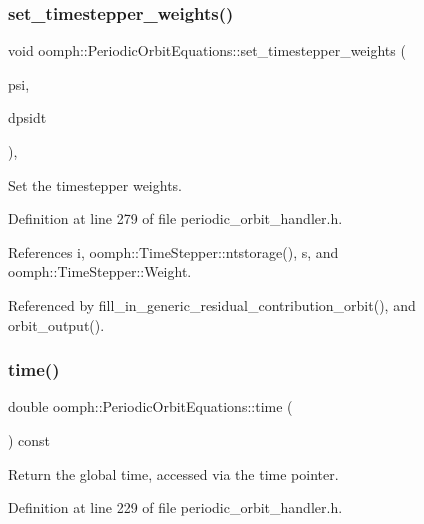 \subsubsection{\texorpdfstring{set\+\_\+timestepper\+\_\+weights()}{set\_timestepper\_weights()}}
{\footnotesize\ttfamily void oomph\+::\+Periodic\+Orbit\+Equations\+::set\+\_\+timestepper\+\_\+weights (\begin{DoxyParamCaption}\item[{const \hyperlink{classoomph_1_1Shape}{Shape} \&}]{psi,  }\item[{const \hyperlink{classoomph_1_1DShape}{D\+Shape} \&}]{dpsidt }\end{DoxyParamCaption})\hspace{0.3cm}{\ttfamily [inline]}, {\ttfamily [protected]}}



Set the timestepper weights. 



Definition at line 279 of file periodic\+\_\+orbit\+\_\+handler.\+h.



References i, oomph\+::\+Time\+Stepper\+::ntstorage(), s, and oomph\+::\+Time\+Stepper\+::\+Weight.



Referenced by fill\+\_\+in\+\_\+generic\+\_\+residual\+\_\+contribution\+\_\+orbit(), and orbit\+\_\+output().

\mbox{\label{classoomph_1_1PeriodicOrbitEquations_a75baee083d554768bd75135196ab26c5}} 
\subsubsection{\texorpdfstring{time()}{time()}}
{\footnotesize\ttfamily double oomph\+::\+Periodic\+Orbit\+Equations\+::time (\begin{DoxyParamCaption}{ }\end{DoxyParamCaption}) const\hspace{0.3cm}{\ttfamily [inline]}}



Return the global time, accessed via the time pointer. 



Definition at line 229 of file periodic\+\_\+orbit\+\_\+handler.\+h.



